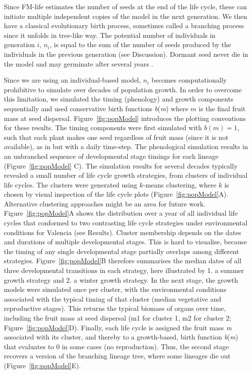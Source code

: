 Since FM-life estimates the number of seeds at the end of the life cycle, these
can initiate multiple independent copies of the model in the next generation. We
then have a classical evolutionary birth process, sometimes called a branching
process since it unfolds in tree-like way. The potential number of individuals
in generation \(i\), \(n_{i}\), is equal to the sum of the number of seeds
produced by the individuals in the previous generation (see Discussion). Dormant
seed never die in the model and may germinate after several years
\citep{burghardt_modeling_2015}.

Since we are using an individual-based model, \(n_{i}\) becomes computationally
prohibitive to simulate over decades of population growth. In order to overcome
this limitation, we simulated the timing (phenology) and growth components
sequentially and used conservative birth functions \emph{b}(\emph{m}) where $m$
is the final fruit mass at seed dispersal. Figure~\ref{fig:popModel} introduces
the plotting conventions for these results. The timing components were first
simulated with \(b(m) = 1\), such that each plant makes one seed regardless of
fruit mass (since it is not available), as in \citet{burghardt_modeling_2015}
but with a daily time-step. The phenological simulation results in an unbranched
sequence of developmental stage timings for each lineage
(Figure~\ref{fig:popModel} C). The simulation results for several decades
typically revealed a small number of life cycle growth strategies, from clusters
of individual life cycles. The clusters were generated using \(k\)-means
clustering, where \(k\) is chosen by visual inspection of the life cycle plots
(Figure~\ref{fig:popModel}A). Alternative clustering approaches might be an area
for future work. Figure~\ref{fig:popModel}A shows the distribution over a year
of all individual life cycles that conformed to two contrasting life cycle
strategies under environmental conditions for Valencia (see Results).  Cluster
membership depends on the dates and durations of multiple developmental
stages. This is hard to visualise, because the timing of any single
developmental stage partially overlaps among different
strategies. Figure~\ref{fig:popModel}B therefore summarises the median dates of
all three developmental transitions in each strategy, here illustrated by 1. a
summer growth strategy and 2. a winter growth strategy. In the next stage, the
growth models were simulated once per cluster, with the environmental conditions
associated with the typical timing of that cluster (median vegetative and
reproductive stages). This returns the typical biomass of organs over time,
including the fruit mass at seed dispersal (m1 for cluster 1, m2 for cluster 2;
Figure~\ref{fig:popModel}D). Finally, each life cycle is assigned the fruit mass
\emph{m} associated with its cluster, and thereby to a growth-based, birth
function \emph{b}(\emph{m}) that evaluates to 0 in some cases (no
reproduction). Thus, the second stage recovers a version of the branching
lineage tree, where some lineages die out (Figure~\ref{fig:popModel}E).

